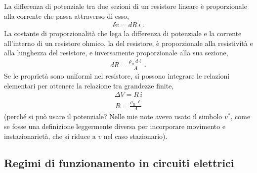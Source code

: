 \documentclass[letterpaper,10pt,english]{jupyterBook}
\begin{document}
\sphinxAtStartPar
{} La differenza di potenziale tra due sezioni di un resistore lineare è proporzionale alla corrente che passa attraverso di esso,
\begin{equation*}
\begin{split}\delta v = dR \, i \ .\end{split}
\end{equation*}
\sphinxAtStartPar
{} La costante di proporzionalità che lega la differenza di potenziale e la corrente all’interno di un resistore ohmico, la  del resistore, è proporzionale alla resistività e alla lunghezza del resistore, e inversamente proporzionale alla sua sezione,
\begin{equation*}
\begin{split}dR = \frac{\rho_R \ d\ell}{A} \ .\end{split}
\end{equation*}
\sphinxAtStartPar
Se le proprietà sono uniformi nel resistore, si possono integrare le relazioni elementari per ottenere la relazione tra grandezze finite,
\begin{equation*}
\begin{split}\Delta V = R \, i \end{split}
\end{equation*}\begin{equation*}
\begin{split}R = \frac{\rho_R \ \ell}{A}\end{split}
\end{equation*}
\sphinxAtStartPar
{} (perché si può usare il potenziale? Nelle mie note avevo usato il simbolo \(v^*\), come se fosse una definizione leggermente diversa per incorporare movimento e instazionarietà, che si riduce a \(v\) nel caso stazionario).

\sphinxAtStartPar
{}

\sphinxAtStartPar
{}

\sphinxAtStartPar
{}

\sphinxAtStartPar
{}

\sphinxstepscope




\subsection{Regimi di funzionamento in circuiti elettrici}
\label{\detokenize{ch/circuits-electric-regimes:regimi-di-funzionamento-in-circuiti-elettrici}}\label{\detokenize{ch/circuits-electric-regimes:classical-electromagnetism-circuits-electric-regimes}}\label{\detokenize{ch/circuits-electric-regimes::doc}}
\sphinxstepscope
\end{document}
